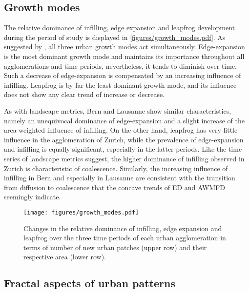 \subsection*{Growth modes}

The relative dominance of infilling, edge expansion and leapfrog development during the period of study is displayed in \autoref{figures/growth_modes.pdf}.
As suggested by \cite{li2013quantifying}, all three urban growth modes act simultaneously.
Edge-expansion is the most dominant growth mode and maintains its importance throughout all agglomerations and time periods, nevertheless, it tends to diminish over time. Such a decrease of edge-expansion is compensated by an increasing influence of infilling. Leapfrog is by far the least dominant growth mode, and its influence does not show any clear trend of increase or decrease.

As with landscape metrics, Bern and Lausanne show similar characteristics, namely an unequivocal dominance of edge-expansion and a slight increase of the area-weighted influence of infilling.
On the other hand, leapfrog has very little influence in the agglomeration of Zurich, while the prevalence of edge-expansion and infilling is equally significant, especially in the latter periods.
Like the time series of landscape metrics suggest, the higher dominance of infilling observed in Zurich is characteristic of coalescence.
Similarly, the increasing influence of infilling in Bern and especially in Lausanne are consistent with the transition from diffusion to coalescence that the concave trends of ED and AWMFD seemingly indicate.

\begin{figure}[!ht]
  \begin{adjustwidth}{0cm}{-.4\textwidth}
    \centering  
    \texttt{[image: figures/growth\_modes.pdf]}
    \vspace{.5em}
    \caption[Three growth modes]{\label{figures/growth_modes.pdf}Changes in the relative dominance of infilling, edge expansion and leapfrog over the three time periods of each urban agglomeration in terms of number of new urban patches (upper row) and their respective area (lower row).}
  \end{adjustwidth}
\end{figure}


\subsection*{Fractal aspects of urban patterns}

